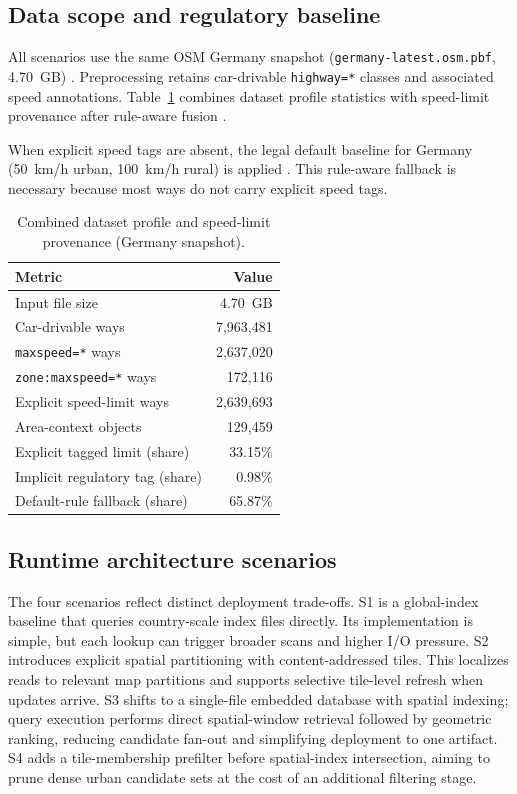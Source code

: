 \documentclass[conference]{IEEEtran}
\begin{document}
\subsection{Data scope and regulatory baseline}
All scenarios use the same OSM Germany snapshot (\texttt{germany-latest.osm.pbf}, \SI{4.70}{GB}) \cite{geofabrik2026}. Preprocessing retains car-drivable \texttt{highway=*} classes and associated speed annotations. Table~\ref{tab:data_profile_provenance} combines dataset profile statistics with speed-limit provenance after rule-aware fusion \cite{osmwiki_highways,osmwiki_maxspeed}.

When explicit speed tags are absent, the legal default baseline for Germany (\SI{50}{km/h} urban, \SI{100}{km/h} rural) is applied \cite{stvo_3}. This rule-aware fallback is necessary because most ways do not carry explicit speed tags.

\begin{table}[!t]
\caption{Combined dataset profile and speed-limit provenance (Germany snapshot).}
\label{tab:data_profile_provenance}
\centering
\begin{tabular}{p{4.8cm}r}
\toprule
Metric & Value \\
\midrule
Input file size & \SI{4.70}{GB} \\
Car-drivable ways & 7{,}963{,}481 \\
\texttt{maxspeed=*} ways & 2{,}637{,}020 \\
\texttt{zone:maxspeed=*} ways & 172{,}116 \\
Explicit speed-limit ways & 2{,}639{,}693 \\
Area-context objects & 129{,}459 \\
\midrule
Explicit tagged limit (share) & 33.15\% \\
Implicit regulatory tag (share) & 0.98\% \\
Default-rule fallback (share) & 65.87\% \\
\bottomrule
\end{tabular}
\end{table}

\subsection{Runtime architecture scenarios}
The four scenarios reflect distinct deployment trade-offs. S1 is a global-index baseline that queries country-scale index files directly. Its implementation is simple, but each lookup can trigger broader scans and higher I/O pressure. S2 introduces explicit spatial partitioning with content-addressed tiles. This localizes reads to relevant map partitions and supports selective tile-level refresh when updates arrive. S3 shifts to a single-file embedded database with spatial indexing; query execution performs direct spatial-window retrieval followed by geometric ranking, reducing candidate fan-out and simplifying deployment to one artifact. S4 adds a tile-membership prefilter before spatial-index intersection, aiming to prune dense urban candidate sets at the cost of an additional filtering stage.
\end{document}
